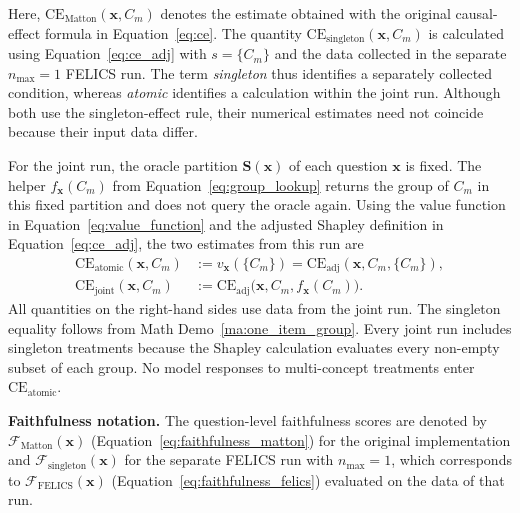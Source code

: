 Here, $\mathrm{CE}_{\mathrm{Matton}}(\mathbf{x},C_m)$ denotes the estimate obtained with the original causal-effect formula in Equation~\ref{eq:ce}. The quantity $\mathrm{CE}_{\mathrm{singleton}}(\mathbf{x},C_m)$ is calculated using Equation~\ref{eq:ce_adj} with $s=\{C_m\}$ and the data collected in the separate $n_{\max}=1$ FELICS run. The term \emph{singleton} thus identifies a separately collected condition, whereas \emph{atomic} identifies a calculation within the joint run. Although both use the singleton-effect rule, their numerical estimates need not coincide because their input data differ.

For the joint run, the oracle partition $\mathbf{S}(\mathbf{x})$ of each question $\mathbf{x}$ is fixed. The helper $f_{\mathbf{x}}(C_m)$ from Equation~\ref{eq:group_lookup} returns the group of $C_m$ in this fixed partition and does not query the oracle again. Using the value function in Equation~\ref{eq:value_function} and the adjusted Shapley definition in Equation~\ref{eq:ce_adj}, the two estimates from this run are
\begin{align}
	\label{eq:evaluation_ce_atomic}
	\mathrm{CE}_{\mathrm{atomic}}(\mathbf{x},C_m)
	 & :=v_{\mathbf{x}}(\{C_m\})
	=\mathrm{CE}_{\mathrm{adj}}(\mathbf{x},C_m,\{C_m\}),                           \\
	\label{eq:evaluation_ce_joint}
	\mathrm{CE}_{\mathrm{joint}}(\mathbf{x},C_m)
	 & :=\mathrm{CE}_{\mathrm{adj}}\bigl(\mathbf{x},C_m,f_{\mathbf{x}}(C_m)\bigr).
\end{align}
All quantities on the right-hand sides use data from the joint run. The singleton equality follows from Math Demo~\ref{ma:one_item_group}. Every joint run includes singleton treatments because the Shapley calculation evaluates every non-empty subset of each group. No model responses to multi-concept treatments enter $\mathrm{CE}_{\mathrm{atomic}}$.

\noindent\textbf{Faithfulness notation.} The question-level faithfulness scores are denoted by $\mathcal{F}_{\mathrm{Matton}}(\mathbf{x})$ (Equation~\ref{eq:faithfulness_matton}) for the original implementation and $\mathcal{F}_{\mathrm{singleton}}(\mathbf{x})$ for the separate FELICS run with $n_{\max}=1$, which corresponds to $\mathcal{F}_{\mathrm{FELICS}}(\mathbf{x})$ (Equation~\ref{eq:faithfulness_felics}) evaluated on the data of that run.

